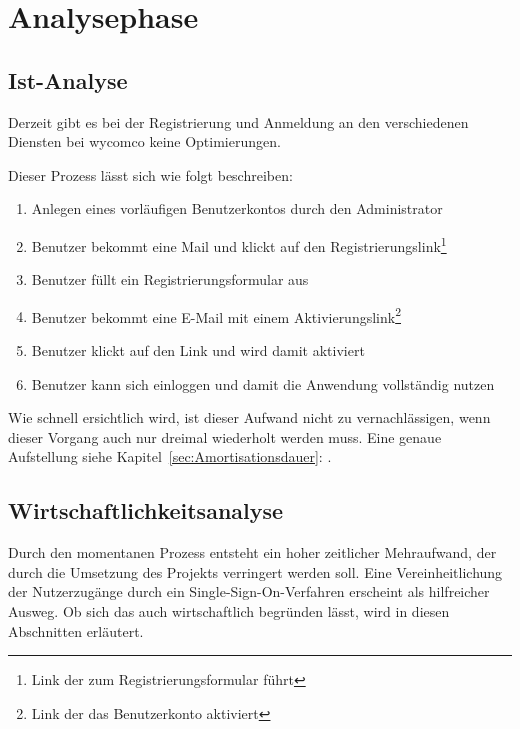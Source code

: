 \section{Analysephase} 
\label{sec:Analysephase}


\subsection{Ist-Analyse} 
\label{sec:IstAnalyse}

Derzeit gibt es bei der Registrierung und Anmeldung an den verschiedenen Diensten bei wycomco keine Optimierungen. 

Dieser Prozess lässt sich wie folgt beschreiben:
\begin{enumerate}
	\item Anlegen eines vorläufigen Benutzerkontos durch den Administrator
	\item Benutzer bekommt eine Mail und klickt auf den Registrierungslink\footnote{Link der zum Registrierungsformular führt}
	\item Benutzer füllt ein Registrierungsformular aus
	\item Benutzer bekommt eine E-Mail mit einem Aktivierungslink\footnote{Link der das Benutzerkonto aktiviert}
	\item Benutzer klickt auf den Link und wird damit aktiviert
	\item Benutzer kann sich einloggen und damit die Anwendung vollständig nutzen
\end{enumerate}

Wie schnell ersichtlich wird, ist dieser Aufwand nicht zu vernachlässigen, wenn dieser Vorgang auch nur dreimal wiederholt werden muss. Eine genaue Aufstellung siehe Kapitel~\ref{sec:Amortisationsdauer}: .

\subsection{Wirtschaftlichkeitsanalyse}
\label{sec:Wirtschaftlichkeitsanalyse}

Durch den momentanen Prozess entsteht ein hoher zeitlicher Mehraufwand, der durch die Umsetzung des Projekts verringert werden soll.
Eine Vereinheitlichung der Nutzerzugänge durch ein Single-Sign-On-Verfahren erscheint als hilfreicher Ausweg.
Ob sich das auch wirtschaftlich begründen lässt, wird in diesen Abschnitten erläutert.

